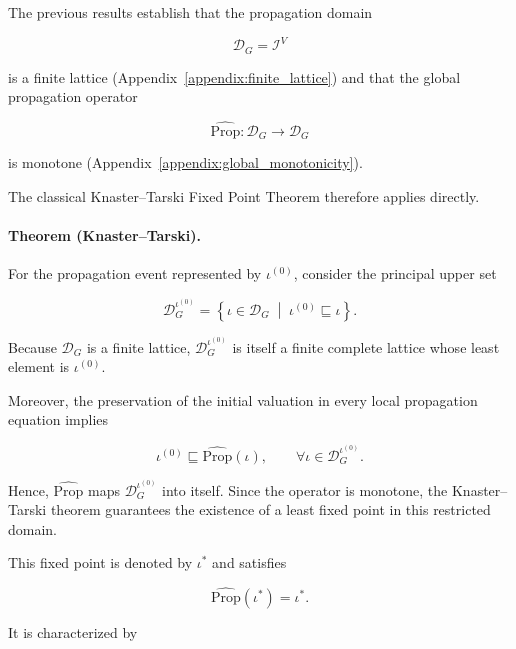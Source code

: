 \documentclass[10pt]{article}
\begin{document}
The previous results establish that the propagation domain

\[
\mathcal D_G
=
\mathcal I^{V}
\]

is a finite lattice (Appendix~\ref{appendix:finite_lattice}) and that the global
propagation operator

\[
\widehat{\mathrm{Prop}}
:
\mathcal D_G
\rightarrow
\mathcal D_G
\]

is monotone (Appendix~\ref{appendix:global_monotonicity}).

The classical Knaster--Tarski Fixed Point Theorem therefore applies directly.

\paragraph{Theorem (Knaster--Tarski).}
For the propagation event represented by $\iota^{(0)}$, consider the principal
upper set

\begin{equation}
	\mathcal D_G^{\iota^{(0)}}
	=
	\left\{
	\iota\in\mathcal D_G
	\;\middle|\;
	\iota^{(0)}
	\sqsubseteq
	\iota
	\right\}.
	\label{eq:initial_upper_domain}
\end{equation}

Because $\mathcal D_G$ is a finite lattice,
$\mathcal D_G^{\iota^{(0)}}$ is itself a finite complete lattice whose least
element is $\iota^{(0)}$.

Moreover, the preservation of the initial valuation in every local propagation
equation implies

\begin{equation}
	\iota^{(0)}
	\sqsubseteq
	\widehat{\mathrm{Prop}}(\iota),
	\qquad
	\forall
	\iota
	\in
	\mathcal D_G^{\iota^{(0)}}.
	\label{eq:operator_preserves_initial_domain}
\end{equation}

Hence,
$\widehat{\mathrm{Prop}}$ maps
$\mathcal D_G^{\iota^{(0)}}$ into itself. Since the operator is monotone,
the Knaster--Tarski theorem guarantees the existence of a least fixed point in
this restricted domain.

This fixed point is denoted by $\iota^{*}$ and satisfies

\begin{equation}
	\widehat{\mathrm{Prop}}
	\left(
	\iota^{*}
	\right)
	=
	\iota^{*}.
	\label{eq:least_fixed_point_above_initial}
\end{equation}

It is characterized by
\end{document}

